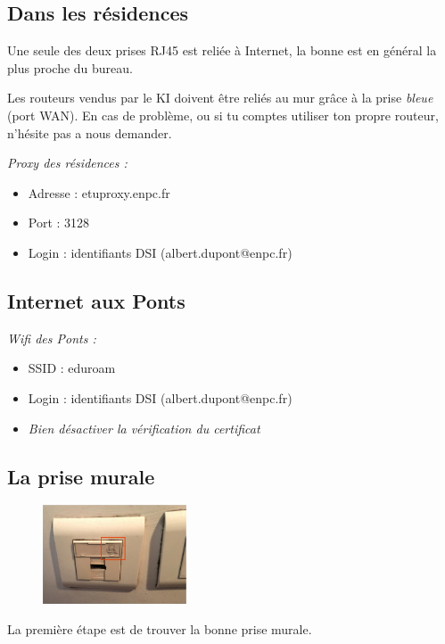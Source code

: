 \documentclass{../templates/enpc-ki/ki019}
\begin{document}
    \vspace{2cm}
    \begin{kiframe}
      \subsection{Dans les résidences} %
        Une seule des deux prises RJ45 est reliée à Internet, la bonne est en général la plus proche du bureau.

        Les routeurs vendus par le KI doivent être reliés au mur grâce à la prise \emph{bleue} (port WAN). En cas de problème, ou si tu comptes utiliser ton propre routeur, n'hésite pas a nous demander.

        \begin{flushleft}
          \emph{Proxy des résidences :}
          \begin{itemize}
            \item Adresse : etuproxy.enpc.fr
            \item Port : 3128
            \item Login : identifiants DSI (albert.dupont@enpc.fr)
          \end{itemize}
        \end{flushleft}

      \subsection{Internet aux Ponts}
        \begin{flushleft}
          \emph{Wifi des Ponts :}
          \begin{itemize}
            \item SSID : eduroam
            \item Login : identifiants DSI (albert.dupont@enpc.fr)
            \item \emph{Bien désactiver la vérification du certificat}
          \end{itemize}
        \end{flushleft}
      \end{kiframe}

  \newpage
    \Header{}


    \tableofcontents

  \newpage

    \subsection{La prise murale}
    \begin{figure}
      \centering
      \includegraphics[width=0.38\textwidth]{page6}
    \end{figure}
    La première étape est de trouver la bonne prise murale.
\end{document}
